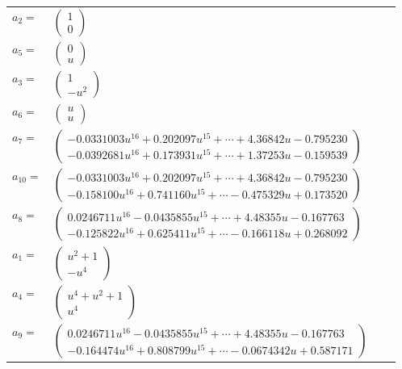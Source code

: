 \documentclass[1p]{elsarticle_modified}
\theoremstyle{definition}
\begin{document}
\begin{tabular}{m{7pt} m{180pt} m{7pt} m{180pt} }
\flushright $a_{2}=$&$\begin{pmatrix}1\\0\end{pmatrix}$ \\
\flushright $a_{5}=$&$\begin{pmatrix}0\\u\end{pmatrix}$ \\
\flushright $a_{3}=$&$\begin{pmatrix}1\\- u^2\end{pmatrix}$ \\
\flushright $a_{6}=$&$\begin{pmatrix}u\\u\end{pmatrix}$ \\
\flushright $a_{7}=$&$\begin{pmatrix}-0.0331003 u^{16}+0.202097 u^{15}+\cdots+4.36842 u-0.795230\\-0.0392681 u^{16}+0.173931 u^{15}+\cdots+1.37253 u-0.159539\end{pmatrix}$ \\
\flushright $a_{10}=$&$\begin{pmatrix}-0.0331003 u^{16}+0.202097 u^{15}+\cdots+4.36842 u-0.795230\\-0.158100 u^{16}+0.741160 u^{15}+\cdots-0.475329 u+0.173520\end{pmatrix}$ \\
\flushright $a_{8}=$&$\begin{pmatrix}0.0246711 u^{16}-0.0435855 u^{15}+\cdots+4.48355 u-0.167763\\-0.125822 u^{16}+0.625411 u^{15}+\cdots-0.166118 u+0.268092\end{pmatrix}$ \\
\flushright $a_{1}=$&$\begin{pmatrix}u^2+1\\- u^4\end{pmatrix}$ \\
\flushright $a_{4}=$&$\begin{pmatrix}u^4+u^2+1\\u^4\end{pmatrix}$ \\
\flushright $a_{9}=$&$\begin{pmatrix}0.0246711 u^{16}-0.0435855 u^{15}+\cdots+4.48355 u-0.167763\\-0.164474 u^{16}+0.808799 u^{15}+\cdots-0.0674342 u+0.587171\end{pmatrix}$ \\

\end{tabular}
\end{document}
